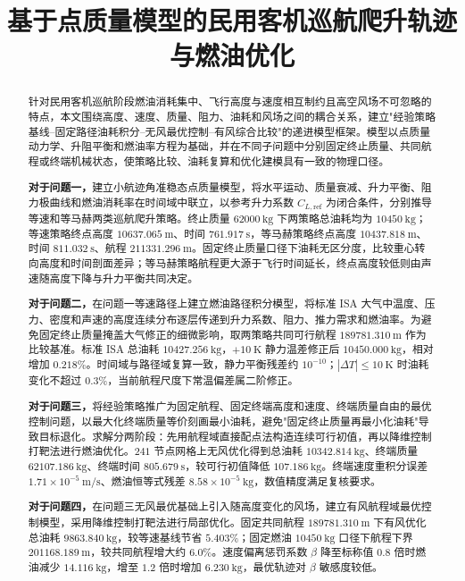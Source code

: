 \documentclass[withoutpreface,bwprint]{cumcmthesis}
\title{基于点质量模型的民用客机巡航爬升轨迹与燃油优化}
\begin{document}

\maketitle

\begin{abstract}
针对民用客机巡航阶段燃油消耗集中、飞行高度与速度相互制约且高空风场不可忽略的特点，本文围绕高度、速度、质量、阻力、油耗和风场之间的耦合关系，建立"经验策略基线--固定路径油耗积分--无风最优控制--有风综合比较"的递进模型框架。模型以点质量动力学、升阻平衡和燃油率方程为基础，并在不同子问题中分别固定终止质量、共同航程或终端机械状态，使策略比较、油耗复算和优化建模具有一致的物理口径。

\textbf{对于问题一，}建立小航迹角准稳态点质量模型，将水平运动、质量衰减、升力平衡、阻力极曲线和燃油消耗率在时间域中联立，以参考升力系数 $C_{L,\mathrm{ref}}$ 为闭合条件，分别推导等速和等马赫两类巡航爬升策略。终止质量 $62000\ \mathrm{kg}$ 下两策略总油耗均为 $10450\ \mathrm{kg}$；等速策略终点高度 $10637.065\ \mathrm{m}$、时间 $761.917\ \mathrm{s}$，等马赫策略终点高度 $10437.818\ \mathrm{m}$、时间 $811.032\ \mathrm{s}$、航程 $211331.296\ \mathrm{m}$。固定终止质量口径下油耗无区分度，比较重心转向高度和时间剖面差异；等马赫策略航程更大源于飞行时间延长，终点高度较低则由声速随高度下降与升力平衡共同决定。

\textbf{对于问题二，}在问题一等速路径上建立燃油路径积分模型，将标准 ISA 大气中温度、压力、密度和声速的高度连续分布逐层传递到升力系数、阻力、推力需求和燃油率。为避免固定终止质量掩盖大气修正的细微影响，取两策略共同可行航程 $189781.310\ \mathrm{m}$ 作为比较基准。标准 ISA 总油耗 $10427.256\ \mathrm{kg}$，$+10\ \mathrm{K}$ 静力温差修正后 $10450.000\ \mathrm{kg}$，相对增加 $0.218\%$。时间域与路径域复算一致，静力平衡残差约 $10^{-10}$；$|\Delta T|\leq10\ \mathrm{K}$ 时油耗变化不超过 $0.3\%$，当前航程尺度下常温偏差属二阶修正。

\textbf{对于问题三，}将经验策略推广为固定航程、固定终端高度和速度、终端质量自由的最优控制问题，以最大化终端质量等价刻画最小油耗，避免"固定终止质量再最小化油耗"导致目标退化。求解分两阶段：先用航程域直接配点法构造连续可行初值，再以降维控制打靶法进行燃油优化。$241$ 节点网格上无风优化得到总油耗 $10342.814\ \mathrm{kg}$、终端质量 $62107.186\ \mathrm{kg}$、终端时间 $805.679\ \mathrm{s}$，较可行初值降低 $107.186\ \mathrm{kg}$。终端速度重积分误差 $1.71\times10^{-5}\ \mathrm{m/s}$、燃油恒等式残差 $8.58\times10^{-5}\ \mathrm{kg}$，数值精度满足复核要求。

\textbf{对于问题四，}在问题三无风最优基础上引入随高度变化的风场，建立有风航程域最优控制模型，采用降维控制打靶法进行局部优化。固定共同航程 $189781.310\ \mathrm{m}$ 下有风优化总油耗 $9863.840\ \mathrm{kg}$，较等速基线节省 $5.403\%$；固定燃油 $10450\ \mathrm{kg}$ 口径下航程下界 $201168.189\ \mathrm{m}$，较共同航程增大约 $6.0\%$。速度偏离惩罚系数 $\beta$ 降至标称值 $0.8$ 倍时燃油减少 $14.116\ \mathrm{kg}$，增至 $1.2$ 倍时增加 $6.230\ \mathrm{kg}$，最优轨迹对 $\beta$ 敏感度较低。


\end{abstract}
\end{document}
